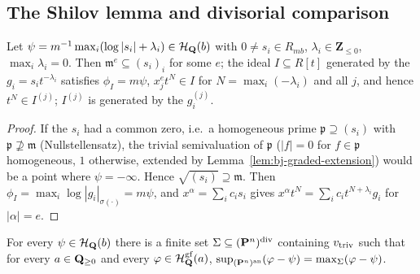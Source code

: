 \subsection{The Shilov lemma and divisorial comparison}

\begin{lemma}\label{lem:bj-finite-fs}
\leanok
{}
Let $\psi=m^{-1}\max_i(\log|s_i|+\lambda_i)\in\mathcal H_{\mathbf{Q}}(b)$ with $0\ne s_i\in R_{mb}$, $\lambda_i\in\mathbf{Z}_{\le0}$,
$\max_i\lambda_i=0$. Then $\mathfrak m^e\subseteq(s_i)_i$ for some $e$; the ideal $I\subseteq R[t]$ generated by
the $g_i=s_it^{-\lambda_i}$ satisfies $\phi_I=m\psi$, $x_j^et^{N}\in I$ for $N=\max_i(-\lambda_i)$ and all $j$, and
hence $t^N\in I^{(j)}$; $I^{(j)}$ is generated by the $g_i^{(j)}$.
\end{lemma}

\begin{proof}
If the $s_i$ had a common zero, i.e.\ a homogeneous prime $\mathfrak p\supseteq(s_i)$ with $\mathfrak p\not\supseteq\mathfrak m$
(Nullstellensatz), the trivial semivaluation of $\mathfrak p$ ($|f|=0$ for $f\in\mathfrak p$ homogeneous, $1$
otherwise, extended by Lemma~\ref{lem:bj-graded-extension}) would be a point where $\psi=-\infty$. Hence
$\sqrt{(s_i)}\supseteq\mathfrak m$. Then $\phi_I=\max_i\log|g_i|_{\sigma(\cdot)}=m\psi$, and
$x^\alpha=\sum_ic_is_i$ gives $x^\alpha t^N=\sum_ic_it^{N+\lambda_i}g_i$ for $|\alpha|=e$.
\end{proof}

\begin{lemma}\label{lem:bj-shilov}
\leanok
{}
For every $\psi\in\mathcal H_{\mathbf{Q}}(b)$ there is a finite set $\Sigma\subseteq(\mathbf{P}^n)^{\mathrm{div}}$ containing $v_{\mathrm{triv}}$
such that for every $a\in\mathbf{Q}_{\ge0}$ and every $\varphi\in\mathcal H^{\mathrm{gf}}_{\mathbf{Q}}(a)$,
$\sup_{(\mathbf{P}^n)^{\mathrm{an}}}(\varphi-\psi)=\max_\Sigma(\varphi-\psi)$.
\end{lemma}

